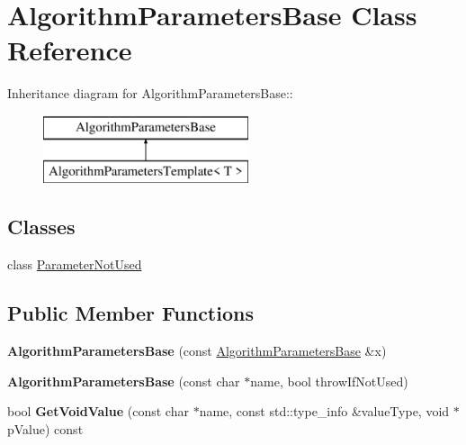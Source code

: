 \hypertarget{class_algorithm_parameters_base}{
\section{AlgorithmParametersBase Class Reference}
\label{class_algorithm_parameters_base}
}
Inheritance diagram for AlgorithmParametersBase::\begin{figure}[H]
\begin{center}
\leavevmode
\includegraphics[height=2cm]{class_algorithm_parameters_base}
\end{center}
\end{figure}
\subsection*{Classes}
\begin{DoxyCompactItemize}
\item 
class \hyperlink{class_algorithm_parameters_base_1_1_parameter_not_used}{ParameterNotUsed}
\end{DoxyCompactItemize}
\subsection*{Public Member Functions}
\begin{DoxyCompactItemize}
\item 
\hypertarget{class_algorithm_parameters_base_ac0ae964369202cfdb50da29f8f7941ee}{
{\bfseries AlgorithmParametersBase} (const \hyperlink{class_algorithm_parameters_base}{AlgorithmParametersBase} \&x)}
\label{class_algorithm_parameters_base_ac0ae964369202cfdb50da29f8f7941ee}

\item 
\hypertarget{class_algorithm_parameters_base_af156d30961a335fa134d25fd60d13afa}{
{\bfseries AlgorithmParametersBase} (const char $\ast$name, bool throwIfNotUsed)}
\label{class_algorithm_parameters_base_af156d30961a335fa134d25fd60d13afa}

\item 
\hypertarget{class_algorithm_parameters_base_a9ee511c8f6b7807f05bb16c659c69135}{
bool {\bfseries GetVoidValue} (const char $\ast$name, const std::type\_\-info \&valueType, void $\ast$pValue) const }
\label{class_algorithm_parameters_base_a9ee511c8f6b7807f05bb16c659c69135}

\end{DoxyCompactItemize}
